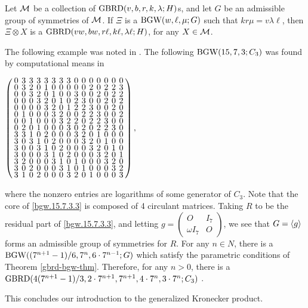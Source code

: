 \documentclass[../../../main]{subfiles}
\begin{document}
\begin{thm}\label{gbrd-bgw-thm}
 Let $\mathcal{M}$ be a collection of $\text{GBRD}(v,b,r,k,\lambda;H)$s, and let $G$ be an admissible group of symmetries of $\mathcal{M}$. If $\Xi$ is a $\text{BGW}(w,\ell,\mu;G)$ such that $kr\mu=v\lambda\ell$, then $\Xi \otimes X$ is a $\text{GBRD}(vw,bw,r\ell,k\ell,\lambda\ell;H)$, for any $X \in \mathcal{M}$.
\end{thm}

\begin{ex}
 The following example was noted in \cite{pender_2020}. The following $\text{BGW}(15,7,3;C_3)$ was found by computational means in \cite{mathon-signings}
 \begin{defenum}
  \item\label{bgw.15.7.3.3} $
  \arraycolsep=2.0pt\def\arraystretch{0.5}
  \left(\begin{array}{ccccccccccccccc}
0&3&3&3&3&3&3&3&0&0&0&0&0&0&0\\
0&3&2&0&1&0&0&0&0&0&2&0&2&2&3\\
0&0&3&2&0&1&0&0&3&0&0&2&0&2&2\\
0&0&0&3&2&0&1&0&2&3&0&0&2&0&2\\
0&0&0&0&3&2&0&1&2&2&3&0&0&2&0\\
0&1&0&0&0&3&2&0&0&2&2&3&0&0&2\\
0&0&1&0&0&0&3&2&2&0&2&2&3&0&0\\
0&2&0&1&0&0&0&3&0&2&0&2&2&3&0\\
3&3&1&0&2&0&0&0&3&2&0&1&0&0&0\\
3&0&3&1&0&2&0&0&0&3&2&0&1&0&0\\
3&0&0&3&1&0&2&0&0&0&3&2&0&1&0\\
3&0&0&0&3&1&0&2&0&0&0&3&2&0&1\\
3&2&0&0&0&3&1&0&1&0&0&0&3&2&0\\
3&0&2&0&0&0&3&1&0&1&0&0&0&3&2\\
3&1&0&2&0&0&0&3&2&0&1&0&0&0&3\\
  \end{array}\right),
   $
 \end{defenum}
 where the nonzero entries are logarithms of some generator of $C_3$. Note that
 the core of \ref{bgw.15.7.3.3} is composed of 4 circulant matrices. Taking $R$
 to be the residual part of \ref{bgw.15.7.3.3}, and letting
 $g=\left(\begin{smallmatrix} O & I_7 \\ \omega I_7 &
                                                      O \end{smallmatrix}\right)$, we see that $G=\langle g\rangle$ forms an admissible group of symmetries for $R$. For any $n \in N$, there is a $\text{BGW}((7^{n+1}-1)/6,7^n,6 \cdot 7^{n-1};G)$ which satisfy the parametric conditions of Theorem \ref{gbrd-bgw-thm}. Therefore, for any $n>0$, there is a $\text{GBRD}(4(7^{n+1}-1)/3,2\cdot 7^{n+1},7^{n+1},4 \cdot 7^n,3\cdot 7^n; C_3)$ .
\end{ex}

This concludes our introduction to the generalized Kronecker product.
 
\biblio
\end{document}
